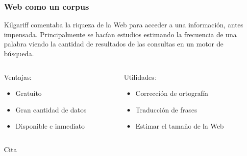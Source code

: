 
\begin{frame}[t]\frametitle{Web como un corpus}
    Kilgariff comentaba la riqueza de la Web para acceder a una información, antes impensada. Principalmente se hacían estudios estimando la frecuencia de una palabra viendo la cantidad de resultados de las consultas en un motor de búsqueda.

\bigskip
\begin{columns}
    \begin{column}{0.5\textwidth}
    Ventajas:
        \begin{itemize}
            \item Gratuito
            \item Gran cantidad de datos
            \item Disponible e inmediato
        \end{itemize}
    \end{column}
    \begin{column}{0.5\textwidth}
    Utilidades:
        \begin{itemize}
            \item Corrección de ortografía
            \item Traducción de frases
            \item Estimar el tamaño de la Web
        \end{itemize}
    \end{column}
\end{columns}

\bigskip
\begin{block}{Cita}
\end{block}

\end{frame}